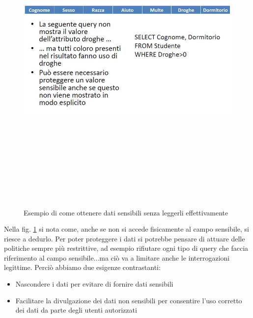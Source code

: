 \begin{figure}[htbp]

	\centering

		{\includegraphics[height=15cm, width=12cm, keepaspectratio]{Immagini/Appendice1/prot_dati_02.jpg}}
			\caption{Esempio di come ottenere dati sensibili senza leggerli effettivamente \label{fig:query_db}}
\end{figure}

Nella fig. \ref{fig:query_db} si nota come, anche se non si accede fisicamente al campo sensibile, si riesce a dedurlo.
Per poter proteggere i dati si potrebbe pensare di attuare delle politiche sempre più restrittive, ad esempio rifiutare ogni tipo di query che faccia riferimento al campo sensibile...ma ciò va a limitare anche le interrogazioni legittime.
Perciò abbiamo due esigenze contrastanti:
\begin{itemize}

	\item Nascondere i dati per evitare di fornire dati sensibili
	\item Facilitare la divulgazione dei dati non sensibili per consentire l'uso corretto dei dati da parte degli utenti autorizzati
	
\end{itemize}


